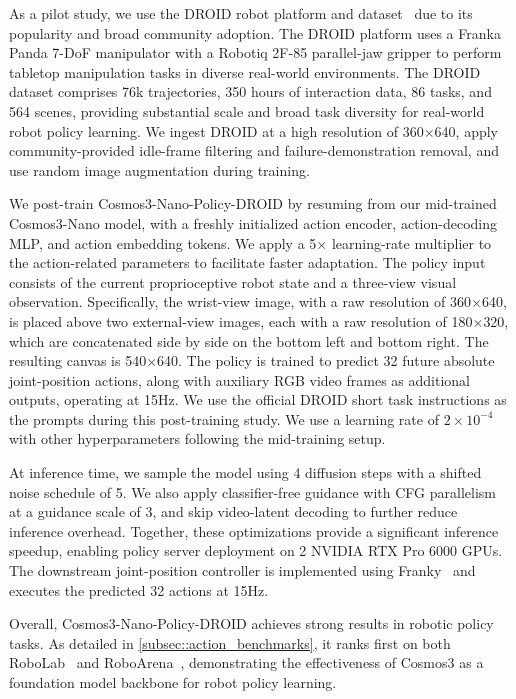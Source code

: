 As a pilot study, we use the DROID robot platform and dataset~\citep{khazatsky2024droid} due to its popularity and broad community adoption. The DROID platform uses a Franka Panda 7-DoF manipulator with a Robotiq 2F-85 parallel-jaw gripper to perform tabletop manipulation tasks in diverse real-world environments. The DROID dataset comprises 76k trajectories, 350 hours of interaction data, 86 tasks, and 564 scenes, providing substantial scale and broad task diversity for real-world robot policy learning. We ingest DROID at a high resolution of 360$\times$640, apply community-provided idle-frame filtering and failure-demonstration removal, and use random image augmentation during training.

We post-train Cosmos3-Nano-Policy-DROID by resuming from our mid-trained Cosmos3-Nano model, with a freshly initialized action encoder, action-decoding MLP, and action embedding tokens. We apply a 5$\times$ learning-rate multiplier to the action-related parameters to facilitate faster adaptation. The policy input consists of the current proprioceptive robot state and a three-view visual observation. Specifically, the wrist-view image, with a raw resolution of 360$\times$640, is placed above two external-view images, each with a raw resolution of 180$\times$320, which are concatenated side by side on the bottom left and bottom right. The resulting canvas is 540$\times$640. The policy is trained to predict 32 future absolute joint-position actions, along with auxiliary RGB video frames as additional outputs, operating at 15Hz. We use the official DROID short task instructions as the prompts during this post-training study. We use a learning rate of $2 \times 10^{-4}$ with other hyperparameters following the mid-training setup.

At inference time, we sample the model using 4 diffusion steps with a shifted noise schedule of 5. We also apply classifier-free guidance with CFG parallelism at a guidance scale of 3, and skip video-latent decoding to further reduce inference overhead. Together, these optimizations provide a significant inference speedup, enabling policy server deployment on 2 NVIDIA RTX Pro 6000 GPUs. The downstream joint-position controller is implemented using Franky~\citep{Schneider_franky_High-Level_Control} and executes the predicted 32 actions at 15Hz.

Overall, Cosmos3-Nano-Policy-DROID achieves strong results in robotic policy tasks. As detailed in \cref{subsec::action_benchmarks}, it ranks first on both RoboLab~\citep{yang2026robolab} and RoboArena~\citep{atreya2025roboarena}, demonstrating the effectiveness of Cosmos3 as a foundation model backbone for robot policy learning.